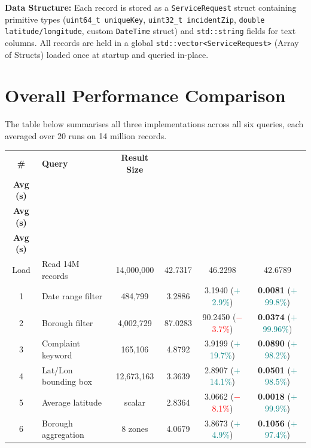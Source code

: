 \documentclass[12pt]{article}
\begin{document}
\vspace{0.5em}
\noindent\textbf{Data Structure:}
Each record is stored as a \texttt{ServiceRequest} struct containing primitive
types (\texttt{uint64\_t uniqueKey}, \texttt{uint32\_t incidentZip},
\texttt{double latitude/longitude}, custom \texttt{DateTime} struct) and
\texttt{std::string} fields for text columns. All records are held in a global
\texttt{std::vector<ServiceRequest>} (Array of Structs) loaded once at startup
and queried in-place.
\section{Overall Performance Comparison}

The table below summarises all three implementations across all six queries,
each averaged over 20 runs on 14 million records.

\begin{center}
\setlength{\tabcolsep}{4pt}
\renewcommand{\arraystretch}{1.2}
\begin{tabularx}{\textwidth}{c X c c c c}
\toprule
\textbf{\#} &
\textbf{Query} &
\textbf{Result Size} &
\makecell{\textbf{Single}\\\textbf{Avg (s)}} &
\makecell{\textbf{Multi (6t)}\\\textbf{Avg (s)}} &
\makecell{\textbf{Optimized (6t)}\\\textbf{Avg (s)}} \\
\midrule
Load & Read 14M records   & 14,000,000  & 42.7317 & 46.2298   & 42.6789  \\
1    & Date range filter      & 484,799     & 3.2886  & 3.1940  {\small(\textcolor{teal}{$+$2.9\%})}   & \textbf{0.0081}  {\small(\textcolor{teal}{$+$99.8\%})}  \\
2    & Borough filter     & 4,002,729   & 87.0283 & 90.2450 {\small(\textcolor{red}{$-$3.7\%})}    & \textbf{0.0374}  {\small(\textcolor{teal}{$+$99.96\%})} \\
3    & Complaint keyword   & 165,106     & 4.8792  & 3.9199  {\small(\textcolor{teal}{$+$19.7\%})}  & \textbf{0.0890}  {\small(\textcolor{teal}{$+$98.2\%})}  \\
4    & Lat/Lon bounding box         & 12,673,163  & 3.3639  & 2.8907  {\small(\textcolor{teal}{$+$14.1\%})}  & \textbf{0.0501}  {\small(\textcolor{teal}{$+$98.5\%})}  \\
5    & Average latitude             & scalar      & 2.8364  & 3.0662  {\small(\textcolor{red}{$-$8.1\%})}    & \textbf{0.0018}  {\small(\textcolor{teal}{$+$99.9\%})}  \\
6    & Borough aggregation          & 8 zones     & 4.0679  & 3.8673  {\small(\textcolor{teal}{$+$4.9\%})}   & \textbf{0.1056}  {\small(\textcolor{teal}{$+$97.4\%})}  \\
\bottomrule
\end{tabularx}
\end{center}
\end{document}
